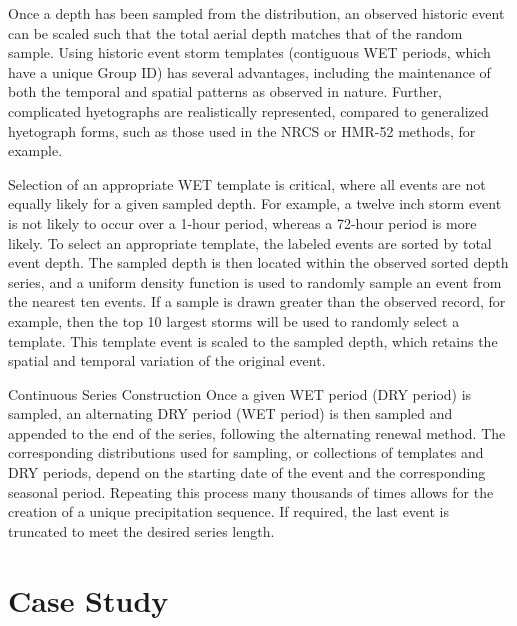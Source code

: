 \documentclass[11pt]{article} %
\begin{document}
Once a depth has been sampled from the distribution, an observed historic event can be scaled such that the total aerial depth matches that of the random sample. Using historic event storm templates (contiguous WET periods, which have a unique Group ID) has several advantages, including the maintenance of both the temporal and spatial patterns as observed in nature. Further, complicated hyetographs are realistically represented, compared to generalized hyetograph forms, such as those used in the NRCS or HMR-52 methods, for example.

Selection of an appropriate WET template is critical, where all events are not equally likely for a given sampled depth. For example, a twelve inch storm event is not likely to occur over a 1-hour period, whereas a 72-hour period is more likely. To select an appropriate template, the labeled events are sorted by total event depth. The sampled depth is then located within the observed sorted depth series, and a uniform density function is used to randomly sample an event from the nearest ten events. If a sample is drawn greater than the observed record, for example, then the top 10 largest storms will be used to randomly select a template. This template event is scaled to the sampled depth, which retains the spatial and temporal variation of the original event.

	Continuous Series Construction
Once a given WET period (DRY period) is sampled, an alternating DRY period (WET period) is then sampled and appended to the end of the series, following the alternating renewal method. The corresponding distributions used for sampling, or collections of templates and DRY periods, depend on the starting date of the event and the corresponding seasonal period. Repeating this process many thousands of times allows for the creation of a unique precipitation sequence. If required, the last event is truncated to meet the desired series length.

\section{Case Study}
\end{document}
